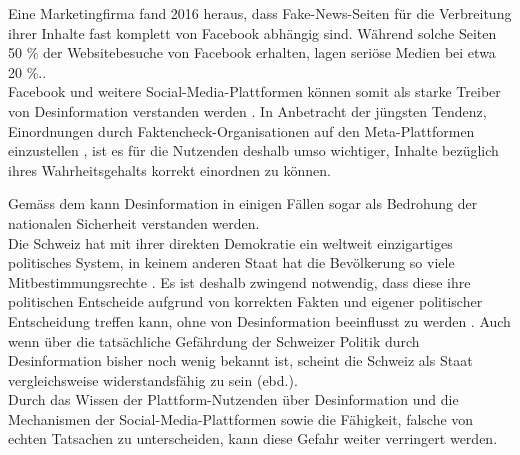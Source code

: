 \documentclass[12pt,a4paper]{article}        %
\begin{document}
Eine Marketingfirma fand 2016 heraus, dass Fake-News-Seiten für die Verbreitung ihrer Inhalte fast komplett  von Facebook abhängig sind. Während solche Seiten 50 \% der Websitebesuche von Facebook erhalten, lagen seriöse Medien bei etwa 20 \%.\parencites{wong_almost_2016}[zit.\ nach][1]{khan_fake_2021}[vgl.\ auch][212]{allcott_social_2017}. \\
Facebook und weitere Social-Media-Plattformen können somit als starke Treiber von Desinformation verstanden werden \parencite{wong_almost_2016}. In Anbetracht der jüngsten Tendenz, Einordnungen durch Faktencheck-Organisationen auf den Meta-Plattformen einzustellen \parencites{isaac_meta_2025}{meta_transparency_centre_penalties_2025}, ist es für die Nutzenden deshalb umso wichtiger, Inhalte bezüglich ihres Wahrheitsgehalts korrekt einordnen zu können.

Gemäss dem \textcites{bundesministerium_des_innern_und_fur_heimat_desinformation_2022}\parencite[zit.\ nach][15]{teetz_social-media-post_2023} kann Desinformation in einigen Fällen sogar als Bedrohung der nationalen Sicherheit verstanden werden. \\
Die Schweiz hat mit ihrer direkten Demokratie ein weltweit einzigartiges politisches System, in keinem anderen Staat hat die Bevölkerung so viele Mitbestimmungsrechte \parencite[2]{sager_politische_2017}. Es ist deshalb zwingend notwendig, dass diese ihre politischen Entscheide aufgrund von korrekten Fakten und eigener politischer Entscheidung treffen kann, ohne von Desinformation beeinflusst zu werden \parencite[26]{vogler_wahrnehmung_2021}\parencite[vgl.\ auch][14f]{european_parliament_directorate-general_for_external_policies_of_the_union_impact_2021}. Auch wenn über die tatsächliche Gefährdung der Schweizer Politik durch Desinformation bisher noch wenig bekannt ist, scheint die Schweiz als Staat vergleichsweise widerstandsfähig zu sein (ebd.).\\
Durch das Wissen der Plattform-Nutzenden über Desinformation und die Mechanismen der Social-Media-Plattformen sowie die Fähigkeit, falsche von echten Tatsachen zu unterscheiden, kann diese Gefahr weiter verringert werden.
\end{document}
